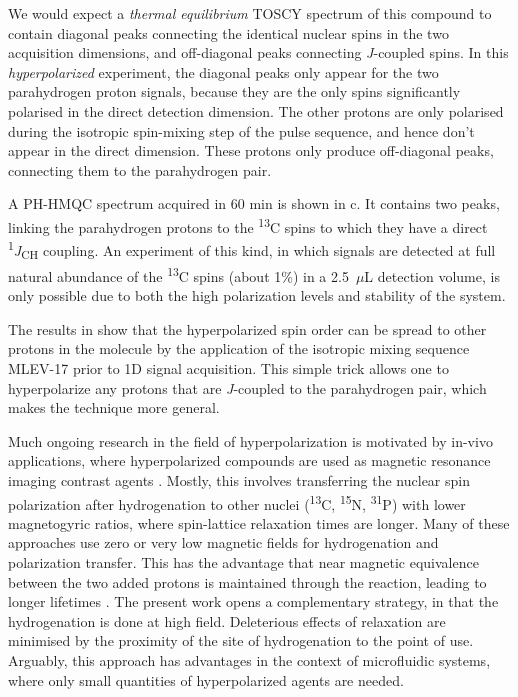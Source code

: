 We would expect a \emph{thermal equilibrium} TOSCY spectrum of this compound to
contain diagonal peaks connecting the identical nuclear spins in the two
acquisition dimensions, and off-diagonal peaks connecting \emph{J}-coupled
spins. In this \emph{hyperpolarized} experiment, the diagonal peaks only appear
for the two parahydrogen proton signals, because they are the only spins
significantly polarised in the direct detection dimension. The other protons
are only polarised during the isotropic spin-mixing step of the pulse sequence,
and hence don't appear in the direct dimension. These protons only produce
off-diagonal peaks, connecting them to the parahydrogen pair.

A PH-HMQC spectrum acquired in 60 min is shown in c.
It contains two peaks, linking the parahydrogen protons to the
\textsuperscript{13}C spins to which they have a direct
\textsuperscript{1}\emph{J}\textsubscript{CH} coupling.
An experiment of this kind, in which signals are
detected at full natural abundance of the \textsuperscript{13}C spins (about
1\%) in a 2.5~$\mu$L  detection volume, is only possible due to both the high
polarization levels and stability of the system.

The results in  show that the hyperpolarized spin order
can be spread to other
protons in the molecule by the application of the isotropic mixing
sequence MLEV-17
 \cite{levittSupercyclesBroadbandHeteronuclear1982,baxMLEV17basedTwodimensionalHomonuclear1985}
 prior to 1D signal acquisition.
 This simple trick
allows one to hyperpolarize any protons that are \emph{J}-coupled to the
parahydrogen pair, which makes the technique more general.

Much ongoing research in the field of hyperpolarization is
motivated by in-vivo applications, where hyperpolarized compounds
are used as magnetic
resonance imaging contrast agents \cite{Hovener:2018cg}.
Mostly, this involves transferring the
nuclear spin polarization after hydrogenation to other nuclei
(\textsuperscript{13}C, \textsuperscript{15}N, \textsuperscript{31}P) with
lower magnetogyric ratios, where spin-lattice relaxation times are longer.
\cite{Goldman:2005bf,Goldman:2006cp,Reineri:2015he} Many of these approaches
use zero or very low magnetic fields for hydrogenation and polarization
transfer. This has the advantage that near magnetic equivalence between the two
added protons is maintained through the reaction, leading to longer lifetimes
\cite{bhattacharya2007towards,chekmenev2008pasadena,
chekmenev2009hyperpolarized,shchepin2014parahydrogen,
Reineri:2015he,cavallari201813,Ripka:2018dc,roy2018sabre}.
The present work opens a complementary strategy, in that the hydrogenation
is done at high field. Deleterious effects of relaxation are minimised by
the proximity of the site of hydrogenation to the point of use. Arguably,
this approach has advantages in the context of microfluidic systems, where
only small quantities of hyperpolarized agents are needed.

